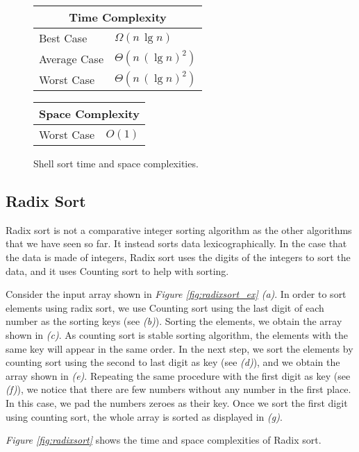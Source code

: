 \begin{figure}[!ht]
    \centering
    \begin{tabular}{l|l}
    \multicolumn{2}{c}{\textbf{Time Complexity}} \\
    \hline
    Best Case    & $\Omega(n \, \lg n)$ \\
    Average Case & $\Theta(n \, (\lg n)^2)$ \\
    Worst Case   & $\Theta(n \, (\lg n)^2)$ \\
    \end{tabular}
    \quad\quad
    \begin{tabular}{l|l}
    \multicolumn{2}{c}{\textbf{Space Complexity}} \\
    \hline
    Worst Case   & $O(1)$
    \end{tabular}
    
    \caption{Shell sort time\cite{big-o} and space complexities\cite{big-o}.}
    \label{fig:shellsort}
\end{figure}


\subsection{Radix Sort}

Radix sort is not a comparative integer sorting algorithm as the other algorithms that we have seen so far. It instead sorts data lexicographically. In the case that the data is made of integers, Radix sort uses the digits of the integers to sort the data, and it uses Counting sort to help with sorting.

Consider the input array shown in \textit{Figure \ref{fig:radixsort_ex} (a)}. In order to sort elements using radix sort, we use Counting sort using the last digit of each number as the sorting keys (see \textit{(b)}). Sorting the elements, we obtain the array shown in \textit{(c)}. As counting sort is stable sorting algorithm, the elements with the same key will appear in the same order. In the next step, we sort the elements by counting sort using the second to last digit as key (see \textit{(d)}), and we obtain the array shown in \textit{(e)}. Repeating the same procedure with the first digit as key (see \textit{(f)}), we notice that there are few numbers without any number in the first place. In this case, we pad the numbers zeroes as their key. Once we sort the first digit using counting sort, the whole array is sorted as displayed in \textit{(g)}.

\textit{Figure \ref{fig:radixsort}} shows the time and space complexities of Radix sort.

